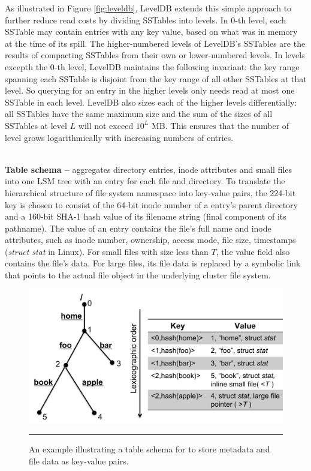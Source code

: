 As illustrated in Figure \ref{fig:leveldb},
LevelDB extends this simple approach to further
reduce read costs by dividing SSTables into levels.
In 0-th level, each SSTable may contain entries with any key value,
based on what was in memory at the time of its spill.
The higher-numbered levels of LevelDB's SSTables are
the results of compacting SSTables from their own or lower-numbered levels.
In levels excepth the 0-th level, LevelDB maintains the following invariant:
the key range spanning each SSTable is disjoint from
the key range of all other SSTables at that level.
So querying for an entry in the higher levels
only needs read at most one SSTable in each level.
LevelDB also sizes each of the higher levels differentially:
all SSTables have the same maximum size and
the sum of the sizes of all SSTables at level $L$ will not exceed $10^L$ MB.
This ensures that the number of level grows
logarithmically with increasing numbers of entries.

~\\
\textbf{Table schema -- }
\tfs aggregates directory entries,
inode attributes and small files into one LSM tree
with an entry for each file and directory.
To translate the hierarchical structure of file system namespace
into key-value pairs, the 224-bit key is chosen to consist of
the 64-bit inode number of a entry's parent directory
and a 160-bit SHA-1 hash value of its filename string
(final component of its pathname).
The value of an entry contains the file's full name and inode attributes,
such as inode number, ownership, access mode, file size, timestamps (\textit{struct stat} in Linux).
For small files with size less than $T$, the value field also contains the file's data.
For large files, its file data is replaced by a symbolic link
that points to the actual file object in the underlying cluster file system.

\begin{figure}[t]
\centering
\includegraphics[scale=0.4]{figs/schema}
\vspace{10pt}
\caption{\textsf{\footnotesize
An example illustrating a table schema for \tfs
to store metadata and file data as key-value pairs.}}
\hrule
\label{fig:schema}
\end{figure}

